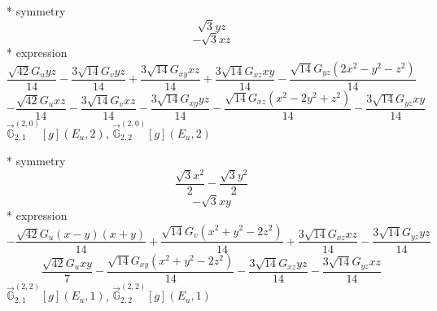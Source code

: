 \documentclass[fleqn,8pt]{jsarticle}
\begin{document}
\noindent\quad ** symmetry
\begin{dmath*}
\sqrt{3} y z
\end{dmath*}
\begin{dmath*}
- \sqrt{3} x z
\end{dmath*}
\noindent\quad ** expression
\begin{dmath*}
\frac{\sqrt{42} G_{u} y z}{14} - \frac{3 \sqrt{14} G_{v} y z}{14} + \frac{3 \sqrt{14} G_{xy} x z}{14} + \frac{3 \sqrt{14} G_{xz} x y}{14} - \frac{\sqrt{14} G_{yz} \left(2 x^{2} - y^{2} - z^{2}\right)}{14}
\end{dmath*}
\begin{dmath*}
- \frac{\sqrt{42} G_{u} x z}{14} - \frac{3 \sqrt{14} G_{v} x z}{14} - \frac{3 \sqrt{14} G_{xy} y z}{14} - \frac{\sqrt{14} G_{xz} \left(x^{2} - 2 y^{2} + z^{2}\right)}{14} - \frac{3 \sqrt{14} G_{yz} x y}{14}
\end{dmath*}
\noindent\quad $\vec{\mathbb{G}}_{2,1}^{(2,0)}[g](E_{u},2)$, $\vec{\mathbb{G}}_{2,2}^{(2,0)}[g](E_{u},2)$

\noindent\quad ** symmetry
\begin{dmath*}
\frac{\sqrt{3} x^{2}}{2} - \frac{\sqrt{3} y^{2}}{2}
\end{dmath*}
\begin{dmath*}
- \sqrt{3} x y
\end{dmath*}
\noindent\quad ** expression
\begin{dmath*}
- \frac{\sqrt{42} G_{u} \left(x - y\right) \left(x + y\right)}{14} + \frac{\sqrt{14} G_{v} \left(x^{2} + y^{2} - 2 z^{2}\right)}{14} + \frac{3 \sqrt{14} G_{xz} x z}{14} - \frac{3 \sqrt{14} G_{yz} y z}{14}
\end{dmath*}
\begin{dmath*}
\frac{\sqrt{42} G_{u} x y}{7} - \frac{\sqrt{14} G_{xy} \left(x^{2} + y^{2} - 2 z^{2}\right)}{14} - \frac{3 \sqrt{14} G_{xz} y z}{14} - \frac{3 \sqrt{14} G_{yz} x z}{14}
\end{dmath*}
\noindent\quad $\vec{\mathbb{G}}_{2,1}^{(2,2)}[g](E_{u},1)$, $\vec{\mathbb{G}}_{2,2}^{(2,2)}[g](E_{u},1)$
\end{document}
